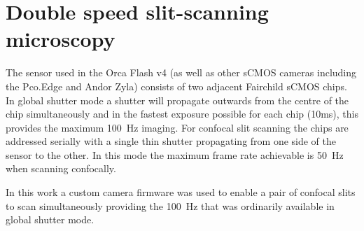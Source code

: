 



\section{Double speed slit-scanning microscopy}

The sensor used in the Orca Flash v4 (as well as other sCMOS cameras including the Pco.Edge and Andor Zyla) consists of two adjacent Fairchild sCMOS chips.
In global shutter mode a shutter will propagate outwards from the centre of the chip simultaneously and in the fastest exposure possible for each chip (10ms), this provides the maximum \SI{100}{\hertz} imaging.
For confocal slit scanning the chips are addressed serially with a single thin shutter propagating from one side of the sensor to the other.
In this mode the maximum frame rate achievable is \SI{50}{\hertz} when scanning confocally.

In this work a custom camera firmware was used to enable a pair of confocal slits to scan simultaneously providing the \SI{100}{\hertz} that was ordinarily available in global shutter mode.

